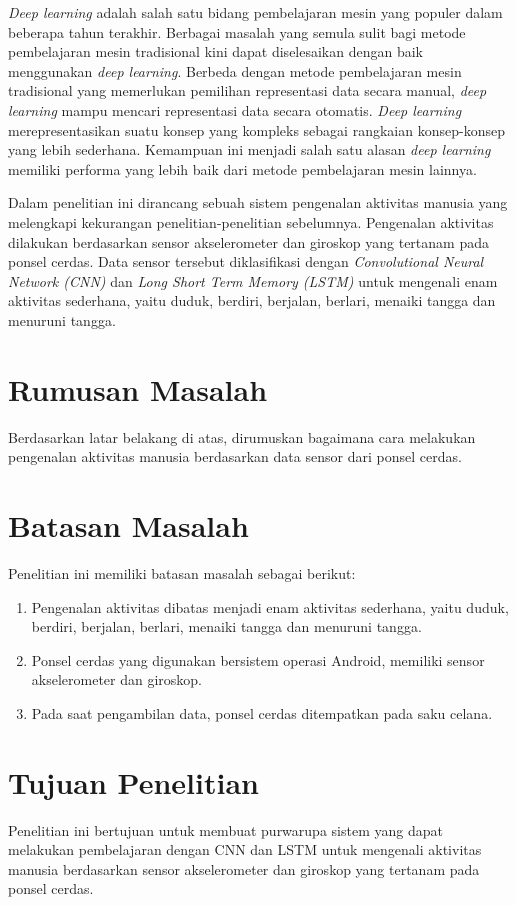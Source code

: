 \textit{Deep learning} adalah salah satu bidang pembelajaran mesin yang populer dalam beberapa tahun terakhir. Berbagai masalah yang semula sulit bagi metode pembelajaran mesin tradisional kini dapat diselesaikan dengan baik menggunakan \textit{deep learning}. Berbeda dengan metode pembelajaran mesin tradisional yang memerlukan pemilihan representasi data secara manual, \textit{deep learning} mampu mencari representasi data secara otomatis. \textit{Deep learning} merepresentasikan suatu konsep yang kompleks sebagai rangkaian konsep-konsep yang lebih sederhana. Kemampuan ini menjadi salah satu alasan \textit{deep learning} memiliki performa yang lebih baik dari metode pembelajaran mesin lainnya.

Dalam penelitian ini dirancang sebuah sistem pengenalan aktivitas manusia yang melengkapi kekurangan penelitian-penelitian sebelumnya. Pengenalan aktivitas dilakukan berdasarkan sensor akselerometer dan giroskop yang tertanam pada ponsel cerdas. Data sensor tersebut diklasifikasi dengan \textit{Convolutional Neural Network (CNN)} dan \textit{Long Short Term Memory (LSTM)} untuk mengenali enam aktivitas sederhana, yaitu duduk, berdiri, berjalan, berlari, menaiki tangga dan menuruni tangga.

\section{Rumusan Masalah}
Berdasarkan latar belakang di atas, dirumuskan bagaimana cara melakukan pengenalan aktivitas manusia berdasarkan data sensor dari ponsel cerdas.

\section{Batasan Masalah}
Penelitian ini memiliki batasan masalah sebagai berikut:

\begin{enumerate}
    \item Pengenalan aktivitas dibatas menjadi enam aktivitas sederhana, yaitu duduk, berdiri, berjalan, berlari, menaiki tangga dan menuruni tangga.
    \item Ponsel cerdas yang digunakan bersistem operasi Android, memiliki sensor akselerometer dan giroskop.
    \item Pada saat pengambilan data, ponsel cerdas ditempatkan pada saku celana.
\end{enumerate}

\section{Tujuan Penelitian}
Penelitian ini bertujuan untuk membuat purwarupa sistem yang dapat melakukan pembelajaran dengan CNN dan LSTM untuk mengenali aktivitas manusia berdasarkan sensor akselerometer dan giroskop yang tertanam pada ponsel cerdas.

